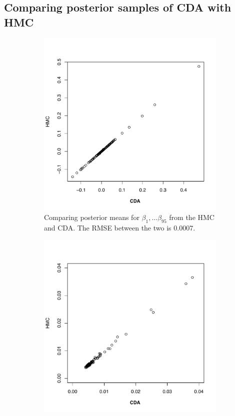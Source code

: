 \documentclass[10pt]{article}
\begin{document}
 \subsection{Comparing posterior samples of CDA with HMC}


\begin{figure}[H]
   \begin{subfigure}[b]{0.45\textwidth}
 \includegraphics[width=1\textwidth]{CDAvsHMC_mean.pdf}
 \caption{Comparing posterior means for $\beta_1,\dots \beta_{95}$ from the HMC and CDA. The  RMSE between the two is $0.0007$.}
 \end{subfigure}
  \hfill 
 \begin{subfigure}[b]{0.45\textwidth}
 \includegraphics[width=1\textwidth]{CDAvsHMC_sd.pdf}

\end{subfigure}
\end{figure}
\end{document}
